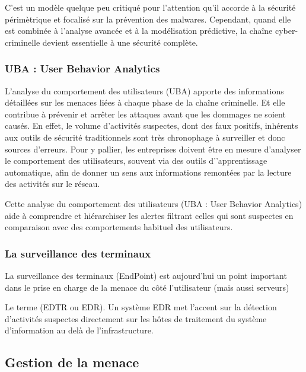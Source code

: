 C’est un modèle quelque peu critiqué pour l’attention qu’il accorde à la sécurité  périmètrique et focalisé sur la prévention des malwares. Cependant, quand elle est combinée à l’analyse avancée et à la modélisation prédictive, la chaîne cyber-criminelle devient essentielle à une sécurité complète.

\subsubsection{UBA : User Behavior Analytics}


L’analyse du comportement des utilisateurs (UBA) apporte des informations détaillées sur les menaces liées à chaque phase de la chaîne criminelle. Et elle contribue à prévenir et arrêter les attaques avant que les dommages ne soient causés. En effet, le volume d’activités suspectes, dont des faux positifs, inhérents aux outils de sécurité traditionnels sont très chronophage à surveiller et donc sources d’erreurs.
Pour y pallier, les entreprises doivent être en mesure d’analyser le comportement des utilisateurs, souvent via des outils d'’apprentissage automatique, afin de donner un sens aux informations remontées par la lecture des activités sur le réseau.

Cette analyse du comportement des utilisateurs (UBA : User Behavior Analytics) aide à  comprendre et hiérarchiser les alertes filtrant celles qui sont suspectes en comparaison avec des comportements habituel des utilisateurs.

\subsubsection{La surveillance des terminaux}

La surveillance des terminaux (EndPoint) est aujourd'hui un point important dans le prise en charge de la menace du côté l'utilisateur (mais aussi serveurs)

 Le  terme  (EDTR ou EDR). Un système EDR met  l’accent sur la détection d’activités suspectes directement sur les hôtes de traitement du système d'information au delà de l'infrastructure. 


\subsection{Gestion de la menace}

